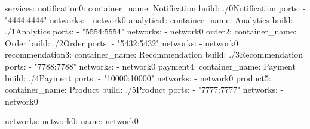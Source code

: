 \begin{yamllisting}
services:
    notification0:
        container_name: Notification
        build: ./0Notification
        ports:
            - "4444:4444"
        networks:
            - network0
    analytics1:
        container_name: Analytics
        build: ./1Analytics
        ports:
            - "5554:5554"
        networks:
            - network0
    order2:
        container_name: Order
        build: ./2Order
        ports:
            - "5432:5432"
        networks:
            - network0
    recommendation3:
        container_name: Recommendation
        build: ./3Recommendation
        ports:
            - "7788:7788"
        networks:
            - network0
    payment4:
        container_name: Payment
        build: ./4Payment
        ports:
            - "10000:10000"
        networks:
            - network0
    product5:
        container_name: Product
        build: ./5Product
        ports:
            - "7777:7777"
        networks:
            - network0

networks:
    network0:
        name: network0
\end{yamllisting}